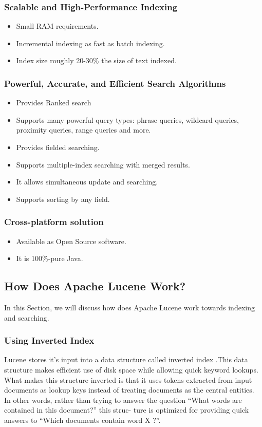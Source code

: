 \subsubsection{Scalable and High-Performance Indexing}
\begin{itemize}
    \item Small RAM requirements.
    \item Incremental indexing as fast as batch indexing.
    \item Index size roughly 20-30\% the size of text indexed.
\end{itemize}

\subsubsection{Powerful, Accurate, and Efficient Search Algorithms}
\begin{itemize}
    \item Provides Ranked search
    \item Supports many powerful query types: phrase queries, wildcard queries, proximity queries, range queries and more.
    \item Provides fielded searching.
    \item Supports multiple-index searching with merged results.
    \item It allows simultaneous update and searching.
    \item Supports sorting by any field.
\end{itemize}

\subsubsection{Cross-platform solution}
\begin{itemize}
    \item Available as Open Source software.
    \item It is 100\%-pure Java.
\end{itemize}

\subsection{How Does Apache Lucene Work?}
In this Section, we will discuss how does Apache Lucene work towards indexing and searching. 
\subsubsection{Using Inverted Index}
Lucene stores it's input into a data structure called inverted index .This data structure makes
efficient use of disk space while allowing quick keyword lookups.\\
What makes this structure inverted is that it uses tokens extracted from input documents as lookup keys
instead of treating documents as the central entities. In other words, rather than
trying to answer the question “What words are contained in this document?” this struc-
ture is optimized for providing quick answers to “Which documents contain word X ?”.
